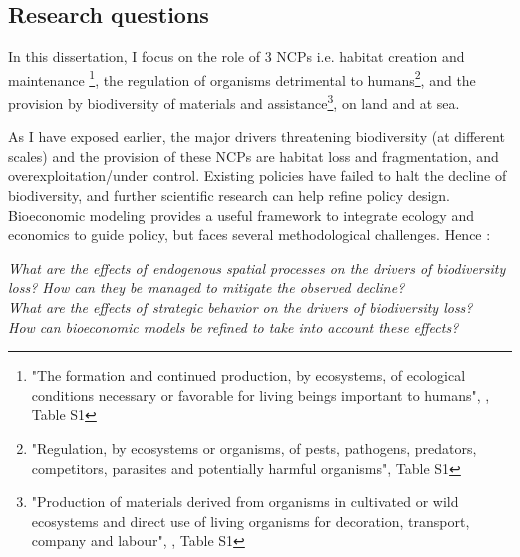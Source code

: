 {}
\subsection*{Research questions}


In this dissertation, I focus on the role of 3 NCPs i.e. habitat creation and maintenance \footnote{"The formation and continued production, by ecosystems, of ecological conditions necessary or favorable for living beings important to humans", \citep{diaz_2018}, Table S1}, the regulation of organisms detrimental to humans\footnote{"Regulation, by ecosystems or organisms, of pests, pathogens, predators, competitors, parasites and potentially harmful organisms"\citep{diaz_2018}, Table S1}, and the provision by biodiversity of materials and assistance\footnote{"Production of materials derived from organisms in cultivated or wild ecosystems and direct use of living organisms for decoration, transport, company and labour", \citep{diaz_2018}, Table S1}, on land and at sea. 

As I have exposed earlier, the major drivers threatening biodiversity (at different scales) and the provision of these NCPs are habitat loss and fragmentation, and overexploitation/under control. Existing policies have failed to halt the decline of biodiversity, and further scientific research can help refine policy design. Bioeconomic modeling provides a useful framework to integrate ecology and economics to guide policy, but faces several methodological challenges. Hence : 

\begin{displayquote}
\textit{What are the effects of endogenous spatial processes on the drivers of biodiversity loss? How can they be managed to mitigate the observed decline?}
\\
\textit{What are the effects of strategic behavior on the drivers of biodiversity loss? }
\\
\textit{How can bioeconomic models be refined to take into account these effects?}
\end{displayquote}
 
